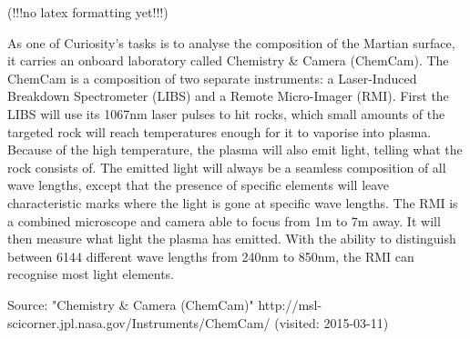 (!!!no latex formatting yet!!!)

As one of Curiosity's tasks is to analyse the composition of the Martian surface, it carries an onboard laboratory called Chemistry & Camera (ChemCam).
 The ChemCam is a composition of two separate instruments: a Laser-Induced Breakdown Spectrometer (LIBS) and a Remote Micro-Imager (RMI).
 First the LIBS will use its 1067nm laser pulses to hit rocks, which small amounts of the targeted rock will reach temperatures enough for it to vaporise into plasma.
 Because of the high temperature, the plasma will also emit light, telling what the rock consists of.
 The emitted light will always be a seamless composition of all wave lengths, except that the presence of specific elements will leave characteristic marks where the light is gone at specific wave lengths.
 The RMI is a combined microscope and camera able to focus from 1m to 7m away.
 It will then measure what light the plasma has emitted.
 With the ability to distinguish between 6144 different wave lengths from 240nm to 850nm, the RMI can recognise most light elements.

Source:
"Chemistry & Camera (ChemCam)"
http://msl-scicorner.jpl.nasa.gov/Instruments/ChemCam/ (visited: 2015-03-11)